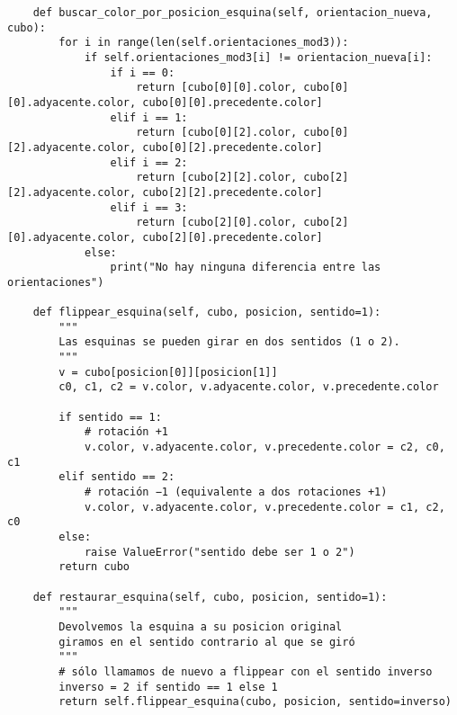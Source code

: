 \begin{lstlisting}
    def buscar_color_por_posicion_esquina(self, orientacion_nueva, cubo):
        for i in range(len(self.orientaciones_mod3)):
            if self.orientaciones_mod3[i] != orientacion_nueva[i]:
                if i == 0:
                    return [cubo[0][0].color, cubo[0][0].adyacente.color, cubo[0][0].precedente.color]
                elif i == 1:
                    return [cubo[0][2].color, cubo[0][2].adyacente.color, cubo[0][2].precedente.color]
                elif i == 2:
                    return [cubo[2][2].color, cubo[2][2].adyacente.color, cubo[2][2].precedente.color]
                elif i == 3:
                    return [cubo[2][0].color, cubo[2][0].adyacente.color, cubo[2][0].precedente.color]
            else:
                print("No hay ninguna diferencia entre las orientaciones")

    def flippear_esquina(self, cubo, posicion, sentido=1):
        """
        Las esquinas se pueden girar en dos sentidos (1 o 2).
        """
        v = cubo[posicion[0]][posicion[1]]
        c0, c1, c2 = v.color, v.adyacente.color, v.precedente.color

        if sentido == 1:
            # rotación +1
            v.color, v.adyacente.color, v.precedente.color = c2, c0, c1
        elif sentido == 2:
            # rotación −1 (equivalente a dos rotaciones +1)
            v.color, v.adyacente.color, v.precedente.color = c1, c2, c0
        else:
            raise ValueError("sentido debe ser 1 o 2")
        return cubo

    def restaurar_esquina(self, cubo, posicion, sentido=1):
        """
        Devolvemos la esquina a su posicion original 
        giramos en el sentido contrario al que se giró
        """
        # sólo llamamos de nuevo a flippear con el sentido inverso
        inverso = 2 if sentido == 1 else 1
        return self.flippear_esquina(cubo, posicion, sentido=inverso)


\end{lstlisting}